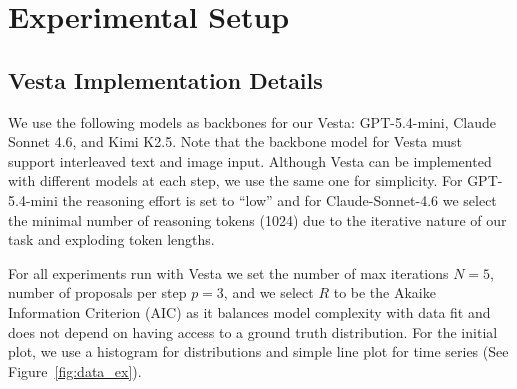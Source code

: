 \documentclass{article}
\newcommand{\method}{{\sc Vesta}}
\begin{document}



\section{Experimental Setup}\label{sec:impl}

\subsection{\method{} Implementation Details}
\vspace{-0.3em}

We use the following models as backbones for our \method{}: GPT-5.4-mini, Claude Sonnet 4.6, and Kimi K2.5. Note that the backbone model for \method{} must support interleaved text and image input. Although \method{} can be implemented with different models at each step, we use the same one for simplicity. For GPT-5.4-mini the reasoning effort is set to ``low'' and for Claude-Sonnet-4.6 we select the minimal number of reasoning tokens (1024) due to the iterative nature of our task and exploding token lengths.
 
For all experiments run with \method{} we set the number of max iterations $N=5$, number of proposals per step $p=3$, and we select $R$ to be the Akaike Information Criterion (AIC) as it balances model complexity with data fit and does not depend on having access to a ground truth distribution. For the initial plot, we use a histogram for distributions and simple line plot for time series (See Figure~\ref{fig:data_ex}). 
\end{document}
